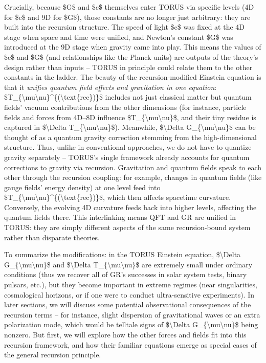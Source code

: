 \documentclass[
]{article}
\begin{document}
Crucially, because \$G\$ and \$c\$ themselves enter TORUS via specific
levels (4D for \$c\$ and 9D for \$G\$), those constants are no longer
just arbitrary: they are built into the recursion structure. The speed
of light \$c\$ was fixed at the 4D stage when space and time were
unified, and Newton's constant \$G\$ was introduced at the 9D stage when
gravity came into play. This means the values of \$c\$ and \$G\$ (and
relationships like the Planck units) are outputs of the theory's design
rather than inputs -- TORUS in principle could relate them to the other
constants in the ladder. The beauty of the recursion-modified Einstein
equation is that it \emph{unifies quantum field effects and gravitation
in one equation}:
\$T\_\{\textbackslash mu\textbackslash nu\}\^{}\{(\textbackslash text\{rec\})\}\$
includes not just classical matter but quantum fields' vacuum
contributions from the other dimensions (for instance, particle fields
and forces from 4D--8D influence
\$T\_\{\textbackslash mu\textbackslash nu\}\$, and their tiny residue is
captured in \$\textbackslash Delta
T\_\{\textbackslash mu\textbackslash nu\}\$). Meanwhile,
\$\textbackslash Delta G\_\{\textbackslash mu\textbackslash nu\}\$ can
be thought of as a quantum gravity correction stemming from the
high-dimensional structure. Thus, unlike in conventional approaches, we
do not have to quantize gravity separately -- TORUS's single framework
already accounts for quantum corrections to gravity via recursion.
Gravitation and quantum fields speak to each other through the recursion
coupling: for example, changes in quantum fields (like gauge fields'
energy density) at one level feed into
\$T\_\{\textbackslash mu\textbackslash nu\}\^{}\{(\textbackslash text\{rec\})\}\$,
which then affects spacetime curvature. Conversely, the evolving 4D
curvature feeds back into higher levels, affecting the quantum fields
there. This interlinking means QFT and GR are unified in TORUS: they are
simply different aspects of the same recursion-bound system rather than
disparate theories.

To summarize the modifications: in the TORUS Einstein equation,
\$\textbackslash Delta G\_\{\textbackslash mu\textbackslash nu\}\$ and
\$\textbackslash Delta T\_\{\textbackslash mu\textbackslash nu\}\$ are
extremely small under ordinary conditions (thus we recover all of GR's
successes in solar system tests, binary pulsars, etc.), but they become
important in extreme regimes (near singularities, cosmological horizons,
or if one were to conduct ultra-sensitive experiments). In later
sections, we will discuss some potential observational consequences of
the recursion terms -- for instance, slight dispersion of gravitational
waves or an extra polarization mode, which would be telltale signs of
\$\textbackslash Delta G\_\{\textbackslash mu\textbackslash nu\}\$ being
nonzero. But first, we will explore how the other forces and fields fit
into this recursion framework, and how their familiar equations emerge
as special cases of the general recursion principle.
\end{document}
